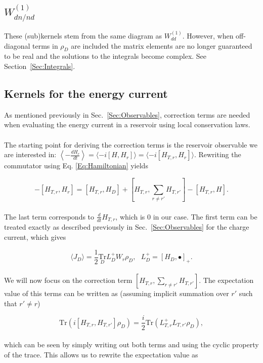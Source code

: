 \documentclass{article}
\newcommand{\Tr}{\ensuremath{\text{Tr}}}
\newcommand{\Tru}[1]{\ensuremath{\underset{#1}{\text{Tr}}}}
\begin{document}
\subsection{$W_{dn/nd}^{(1)}$}

These (sub)kernels stem from the same diagram as $W^{(1)}_{dd}$. However, when off-diagonal terms in $\rho_D$ are included the matrix elements are no longer guaranteed to be real and the solutions to the integrals become complex. See Section~\ref{Sec:Integrals}.
\subsection{Kernels for the energy current}

As mentioned previously in Sec.~\ref{Sec:Observables}, correction terms are needed when evaluating the energy current in a reservoir using local conservation laws. 
\\
\\
The starting point for deriving the correction terms is the reservoir observable we are interested in: $\left \langle -\frac{dH_r}{dt} \right \rangle= \langle-i[H, H_r]\rangle = \langle-i[H_{T,r}, H_r]\rangle$. Rewriting the commutator using  Eq. \ref{Eq:Hamiltonian} yields

\begin{equation}
    -[H_{T,r}, H_r] = [H_{T,r}, H_D] + [H_{T,r}, \sum_{r\ne r'}H_{T,r'}] - [H_{T,r}, H].
\end{equation}
\\
The last term corresponds to $\frac{d}{dt}H_{T,r}$, which is $0$ in our case. The first term can be treated exactly as described previously in Sec.~\ref{Sec:Observables} for the charge current, which gives

\begin{equation}
    \langle J_D\rangle = \frac{1}{2}\Tru{D}L_D^+ W_r\rho_D, \ \ \ L_D^+=[H_D,  \bullet]_+ .
\end{equation}
\\
We will now focus on the correction term $[H_{T,r}, \sum_{r\ne r'}H_{T,r'}]$. The expectation value of this terms can be written as (assuming implicit summation over $r'$ such that $r'\ne r$)

\begin{equation}
    \Tr\left ( i[H_{T,r}, H_{T,r'}]\rho_D \right ) = \frac{i}{2}\Tr\left ( L_{T,r}^+L_{T,r'} \rho_D \right ),
\end{equation}
\\
which can be seen by simply writing out both terms and using the cyclic property of the trace. This allows us to rewrite the expectation value as 
\end{document}
